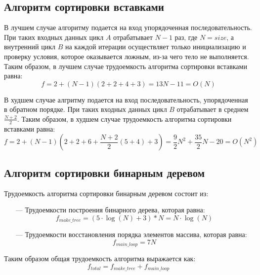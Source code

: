 \subsection{Алгоритм сортировки вставками}

В лучшем случае алгоритму подается на вход упорядоченная последовательность.
При таких входных данных цикл $A$ отрабатывает $N - 1$ раз, где $N = size$, а
внутренний цикл $B$ на каждой итерации осуществляет только инициализацию и
проверку условия, которое оказывается ложным, из-за чего тело не выполняется. 
Таким образом, в лучшем случае трудоемкость алгоритма сортировки вставками
равна:
    \begin{equation}\label{eq:bestinsert}
        f = 2 + (N - 1)(2 + 2 + 4 + 3) = 13N - 11=O(N)    
    \end{equation}

В худшем случае алгритму подается на вход последовательность, упорядоченная в
обратном порядке. При таких входных данных цикл $B$ отрабатывает в среднем
$\frac{N+2}{2}$. Таким образом, в худшем случае трудоемкость алгоритма
сортировки вставками равна:
    \begin{equation}\label{eq:worstinsert}
        f = 2 + (N - 1)(2 + 2 + 6 + \frac{N+2}{2}(5 + 4) + 3)
                   = \frac{9}{2}N^2 + \frac{35}{2}N - 20 = O(N^2)
    \end{equation}

\subsection{Алгоритм сортировки бинарным деревом}

Трудоемкость алгоритма сортировки бинарным деревом состоит из:
\begin{itemize}
	\item[---] Трудоемкости построения бинарного дерева, которая равна:
	\begin{equation}
		\label{make_tree}
		f_{make\_tree} = (5 \cdot \log(N) + 3) * N = N \cdot \log(N)
	\end{equation}
	\item[---] Трудоемкости восстановления порядка элементов массива, которая равна:
	\begin{equation}
		\label{make_arr}
		f_{main\_loop} = 7 N
	\end{equation}
\end{itemize}

Таким образом общая трудоемкость алгоритма выражается как:
\begin{equation}
	\label{for:been_total}
	f_{total} = f_{make\_tree} + f_{main\_loop}
\end{equation}

